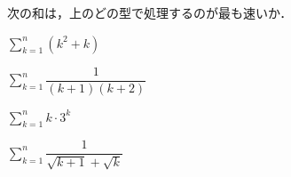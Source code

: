 \documentclass[lualatex,paper=b5j,fontsize=10pt,twoside]{jlreq}
\begin{document}


次の和は，上のどの型で処理するのが最も速いか．

\begin{msdrill}
  \item $\displaystyle\sum_{k=1}^{n}(k^2+k)$
  \item $\displaystyle\sum_{k=1}^{n}\dfrac{1}{(k+1)(k+2)}$
  \item $\displaystyle\sum_{k=1}^{n}k\cdot 3^{k}$
  \item $\displaystyle\sum_{k=1}^{n}\dfrac{1}{\sqrt{k+1}+\sqrt{k}}$
\end{msdrill}

\begin{msanswerstrip}
\end{msanswerstrip}
\end{document}
